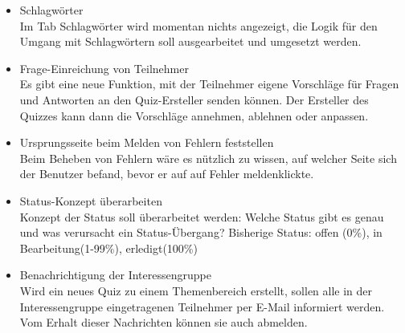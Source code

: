 \begin{itemize}
	\item Schlagwörter \\
	Im Tab Schlagwörter wird momentan nichts angezeigt, die Logik für den Umgang mit Schlagwörtern soll ausgearbeitet und umgesetzt werden.
	
	\item Frage-Einreichung von Teilnehmer \\
	Es gibt eine neue Funktion, mit der Teilnehmer eigene Vorschläge für Fragen und Antworten an den Quiz-Ersteller senden können. Der Ersteller des Quizzes kann dann die Vorschläge annehmen, ablehnen oder anpassen.
	
	\item Ursprungsseite beim Melden von Fehlern feststellen \\
	Beim Beheben von Fehlern wäre es nützlich zu wissen, auf welcher Seite sich der Benutzer befand, bevor er auf auf \glqq Fehler melden\grqq klickte.
	
	\item Status-Konzept überarbeiten \\
	Konzept der Status soll überarbeitet werden: Welche Status gibt es genau und was verursacht ein Status-Übergang?
	Bisherige Status: offen (0\%), in Bearbeitung(1-99\%), erledigt(100\%)
	
	\item Benachrichtigung der Interessengruppe\\
	Wird ein neues Quiz zu einem Themenbereich erstellt, sollen alle in der Interessengruppe eingetragenen Teilnehmer per E-Mail informiert werden. Vom Erhalt dieser Nachrichten können sie auch abmelden.
	
\end{itemize}


